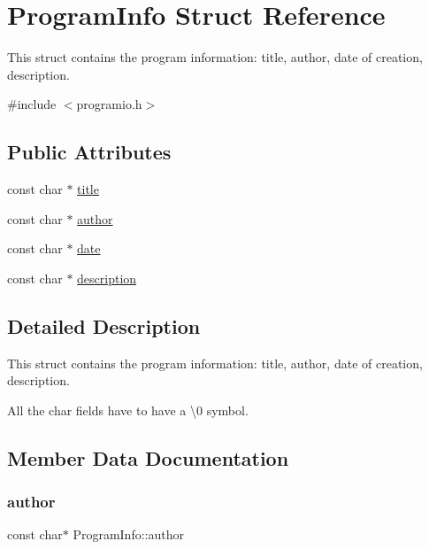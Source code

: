 \hypertarget{structProgramInfo}{}\section{Program\+Info Struct Reference}
\label{structProgramInfo}


This struct contains the program information\+: title, author, date of creation, description.  




{\ttfamily \#include $<$programio.\+h$>$}

\subsection*{Public Attributes}
\begin{DoxyCompactItemize}
\item 
const char $\ast$ \hyperlink{structProgramInfo_aaf3f9430d23c98fce1627ec0bd052e13}{title}
\item 
const char $\ast$ \hyperlink{structProgramInfo_a5ca0535e58500138faffa92fd86dc30f}{author}
\item 
const char $\ast$ \hyperlink{structProgramInfo_abfdfeeffcae75443aff7f057d533a678}{date}
\item 
const char $\ast$ \hyperlink{structProgramInfo_a036dc2e0c0bc90d7d28ca8c41b08b36f}{description}
\end{DoxyCompactItemize}


\subsection{Detailed Description}
This struct contains the program information\+: title, author, date of creation, description. 

All the char fields have to have a \textquotesingle{}\textbackslash{}0\textquotesingle{} symbol. 

\subsection{Member Data Documentation}
\mbox{\label{structProgramInfo_a5ca0535e58500138faffa92fd86dc30f}} 
\subsubsection{\texorpdfstring{author}{author}}
{\footnotesize\ttfamily const char$\ast$ Program\+Info\+::author}


